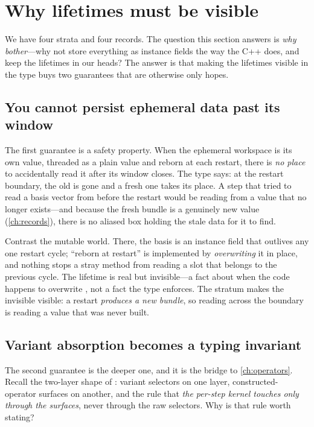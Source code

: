 \section{Why lifetimes must be visible}
\label{sec:visible}

We have four strata and four records. The question this section answers is
\emph{why bother}---why not store everything as instance fields the way the C++
does, and keep the lifetimes in our heads? The answer is that making the
lifetimes visible in the type buys two guarantees that are otherwise only
hopes.

\subsection{You cannot persist ephemeral data past its window}

The first guarantee is a safety property. When the ephemeral 
workspace is its own value, threaded as a plain value and reborn at each restart,
there is \emph{no place} to accidentally read it after its window closes. The
type says: at the restart boundary, the old  is gone and a fresh one
takes its place. A step that tried to read a basis vector from before the restart
would be reading from a value that no longer exists---and because the fresh
bundle is a genuinely new value (\cref{ch:records}), there is no aliased box
holding the stale data for it to find.

Contrast the mutable world. There, the basis  is an instance field that
outlives any one restart cycle; ``reborn at restart'' is implemented by
\emph{overwriting} it in place, and nothing stops a stray method from reading a
slot that belongs to the previous cycle. The lifetime is real but invisible---a
fact about when the code happens to overwrite , not a fact the type
enforces. The stratum makes the invisible visible: a restart \emph{produces a
new bundle}, so reading across the boundary is reading a value that was never
built.

\subsection{Variant absorption becomes a typing invariant}

The second guarantee is the deeper one, and it is the bridge to
\cref{ch:operators}. Recall the two-layer shape of : variant
selectors on one layer, constructed-operator surfaces on another, and the rule
that \emph{the per-step kernel touches  only through the
surfaces}, never through the raw selectors. Why is that rule worth stating?

